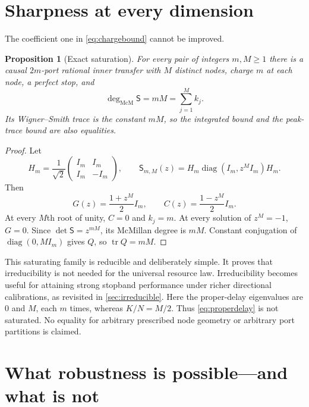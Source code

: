 \documentclass[11pt]{article}
\newtheorem{proposition}[theorem]{Proposition}
\theoremstyle{definition}
\theoremstyle{remark}
\newcommand{\diag}{\operatorname{diag}}
\newcommand{\tr}{\operatorname{tr}}
\newcommand{\mcdeg}{\deg_{\mathrm{McM}}}
\begin{document}
\section{Sharpness at every dimension}

The coefficient one in \eqref{eq:chargebound} cannot be improved.

\begin{proposition}[Exact saturation]
\label{prop:sharp}
For every pair of integers $m,M\geq1$ there is a causal $2m$-port rational inner transfer with
$M$ distinct nodes, charge $m$ at each node, a perfect stop, and
\begin{equation}\label{eq:sharp}
 \mcdeg\mathsf S=mM=\sum_{j=1}^{M}k_j.
\end{equation}
Its Wigner--Smith trace is the constant $mM$, so the integrated bound and the
peak-trace bound are also equalities.
\end{proposition}

\begin{proof}
Let
\[
 H_m=\frac1{\sqrt2}\begin{pmatrix}I_m&I_m\\I_m&-I_m\end{pmatrix},
 \qquad
 \mathsf S_{m,M}(z)=H_m\diag(I_m,z^M I_m)H_m.
\]
Then
\begin{equation}\label{eq:sharpblocks}
 G(z)=\frac{1+z^M}{2}I_m,
 \qquad C(z)=\frac{1-z^M}{2}I_m.
\end{equation}
At every $M$th root of unity, $C=0$ and $k_j=m$.  At every solution of
$z^M=-1$, $G=0$.  Since $\det\mathsf S=z^{mM}$, its McMillan degree is $mM$.
Constant conjugation of $\diag(0,MI_m)$ gives $Q$, so $\tr Q=mM$.
\end{proof}

This saturating family is reducible and deliberately simple.  It proves that
irreducibility is not needed for the universal resource law.  Irreducibility
becomes useful for attaining strong stopband performance under richer
directional calibrations, as revisited in \cref{sec:irreducible}. Here the
proper-delay eigenvalues are $0$ and $M$, each $m$ times, whereas $K/N=M/2$.
Thus \eqref{eq:properdelay} is not saturated. No equality for arbitrary
prescribed node geometry or arbitrary port partitions is claimed.

\section{What robustness is possible---and what is not}
\end{document}
